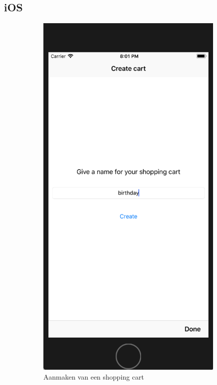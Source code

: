 \subsection{iOS}
\begin{figure}[H]
	\centering
	\begin{subfigure}{.5\textwidth}
		\centering
		\includegraphics[width=0.65\linewidth]{img/poc/ios/1.png}
		\caption{Aanmaken van een shopping cart}
	\end{subfigure}%
	\begin{subfigure}{.5\textwidth}
		\centering

\end{subfigure}
\end{figure}

